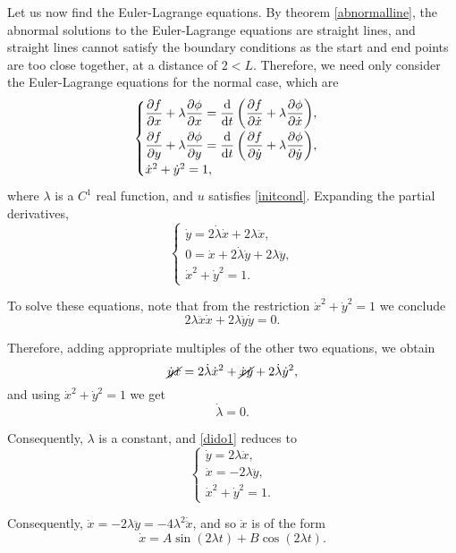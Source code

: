\documentclass{article}
\theoremstyle{plain}
\theoremstyle{plain}
\theoremstyle{nonumberplain}
\theoremstyle{empty}
\begin{document}
Let us now find the Euler-Lagrange equations. By theorem \ref{abnormalline}, the abnormal solutions to the Euler-Lagrange equations are straight lines, and straight lines cannot satisfy the boundary conditions as the start and end points are too close together, at a distance of $2 < L$. Therefore, we need only consider the Euler-Lagrange equations for the normal case, which are
\[
\begin{cases}
\displaystyle \diffp f x + \lambda \diffp \phi x = \diff*{\left(\diffp f {\dot x} + \lambda \diffp \phi {\dot x}\right)}t,\\[0.7em]
\displaystyle \diffp f y + \lambda \diffp \phi y = \diff*{\left( \diffp f {\dot y} + \lambda \diffp \phi {\dot y}\right)}t,\\
\dot x^2 + \dot y^2 = 1,
\end{cases}
\]
where $\lambda$ is a $C^1$ real function, and $u$ satisfies \eqref{initcond}. Expanding the partial derivatives,
\begin{equation}\label{dido1}
\begin{cases}
\dot y  = 2 \dot \lambda \dot x + 2 \lambda \ddot x,\\
0 = \dot x + 2 \dot \lambda \dot y + 2 \lambda \ddot y,\\
\dot x^2 + \dot y^2 = 1.
\end{cases}
\end{equation}

To solve these equations, note that from the restriction $\dot x^2 + \dot y^2 = 1$ we conclude
\[2\lambda \ddot x \dot x + 2 \lambda \ddot y \dot y = 0.\]

Therefore, adding appropriate multiples of the other two equations, we obtain
\[\cancel{\dot y \dot x} = 2 \dot \lambda \dot x^2 + \cancel{\dot x \dot y} + 2 \dot \lambda \dot y^2,\]
and using $\dot x^2 + \dot y^2 = 1$ we get
\[\dot \lambda = 0.\]

Consequently, $\lambda$ is a constant, and \eqref{dido1} reduces to
\begin{equation}\label{dido2}
\begin{cases}
\dot y  = 2 \lambda \ddot x,\\
\dot x = - 2 \lambda \ddot y,\\
\dot x^2 + \dot y^2 = 1.
\end{cases}
\end{equation}

Consequently, $\dot x = - 2 \lambda \ddot y = -4 \lambda^2 \dot{\ddot x}$, and so $\dot x$ is of the form
\[\dot x = A \sin(2 \lambda t) + B \cos(2 \lambda t).\]
\end{document}
